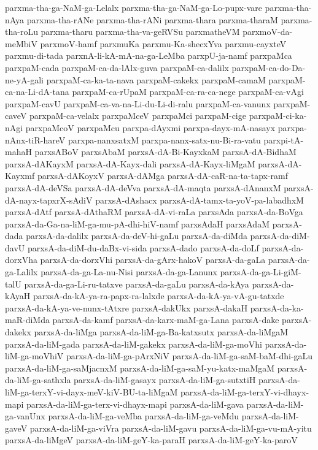 {parxma-tha-ga-NaM-ga-Lelalx
parxma-tha-ga-NaM-ga-Lo-pupx-vare
parxma-tha-nAya
parxma-tha-rANe
parxma-tha-rANi
parxma-thara
parxma-tharaM
parxma-tha-roLu
parxma-tharu
parxma-tha-va-geRVSu
parxmatheVM
parxmoV-da-meMbiV
parxmoV-hamf
parxmuKa
parxmu-Ka-shecxYva
parxmu-cayxteV
parxmu-di-tada
parxnA-li-kA-mA-na-ga-LeMba
parxpU-ja-namf
parxpaMca
parxpaM-cada
parxpaM-ca-da-lAlx-guva
parxpaM-ca-dalilx
parxpaM-ca-do-Da-ne-yA-gali
parxpaM-ca-ka-ta-nava
parxpaM-cakekx
parxpaM-camaM
parxpaM-ca-na-Li-dA-tana
parxpaM-ca-rUpaM
parxpaM-ca-ra-ca-nege
parxpaM-ca-vAgi
parxpaM-cavU
parxpaM-ca-va-na-Li-du-Li-di-ralu
parxpaM-ca-vanunx
parxpaM-caveV
parxpaM-ca-velalx
parxpaMceV
parxpaMci
parxpaM-cige
parxpaM-ci-ka-nAgi
parxpaMcoV
parxpaMcu
parxpa-dAyxmi
parxpa-dayx-mA-nasayx
parxpa-nAnx-tiR-hareV
parxpa-nanxsatxM
parxpa-nanx-satx-nu-Bi-ra-vatu
parxpi-tA-mahaH
parxsABoV
parxsAbaM
parxsA-dA-Bi-KayxkaM
parxsA-dA-BidhaM
parxsA-dAKayxM
parxsA-dA-Kayx-dali
parxsA-dA-Kayx-liMgaM
parxsA-dA-Kayxmf
parxsA-dAKoyxV
parxsA-dAMga
parxsA-dA-caR-na-ta-tapx-ramf
parxsA-dA-deVSa
parxsA-dA-deVva
parxsA-dA-maqta
parxsA-dAnanxM
parxsA-dA-nayx-tapxrX-sAdiV
parxsA-dAshacx
parxsA-dA-tamx-ta-yoV-pa-labadhxM
parxsA-dAtf
parxsA-dAthaRM
parxsA-dA-vi-raLa
parxsAda
parxsA-da-BoVga
parxsA-da-Ga-na-liM-ga-mu-pA-dhi-hiV-namf
parxsAdaH
parxsAdaM
parxsA-dada
parxsA-da-dalilx
parxsA-da-deV-hi-gaLu
parxsA-da-diMda
parxsA-da-diM-davU
parxsA-da-diM-du-daBx-vi-sida
parxsA-dado
parxsA-da-doLf
parxsA-da-dorxVha
parxsA-da-dorxVhi
parxsA-da-gArx-hakoV
parxsA-da-gaLa
parxsA-da-ga-Lalilx
parxsA-da-ga-La-nu-Nisi
parxsA-da-ga-Lanunx
parxsA-da-ga-Li-giM-talU
parxsA-da-ga-Li-ru-tatxve
parxsA-da-gaLu
parxsA-da-kAya
parxsA-da-kAyaH
parxsA-da-kA-ya-ra-papx-ra-lalxde
parxsA-da-kA-ya-vA-gu-tatxde
parxsA-da-kA-ya-ve-nunx-tAtxre
parxsA-dakUkx
parxsA-dakaH
parxsA-da-ka-maR-diMda
parxsA-da-kamf
parxsA-da-karx-maM-ga-Lana
parxsA-dake
parxsA-dakekx
parxsA-da-liMga
parxsA-da-liM-ga-Ba-katxsutx
parxsA-da-liMgaM
parxsA-da-liM-gada
parxsA-da-liM-gakekx
parxsA-da-liM-ga-moVhi
parxsA-da-liM-ga-moVhiV
parxsA-da-liM-ga-pArxNiV
parxsA-da-liM-ga-saM-baM-dhi-gaLu
parxsA-da-liM-ga-saMjacnxM
parxsA-da-liM-ga-saM-yu-katx-maMgaM
parxsA-da-liM-ga-sathxla
parxsA-da-liM-gasayx
parxsA-da-liM-ga-sutxtiH
parxsA-da-liM-ga-terxY-vi-dayx-meV-kiV-BU-ta-liMgaM
parxsA-da-liM-ga-terxY-vi-dhayx-mapi
parxsA-da-liM-ga-terx-vi-dhayx-mapi
parxsA-da-liM-gava
parxsA-da-liM-ga-vanUnx
parxsA-da-liM-ga-veMba
parxsA-da-liM-ga-veMdu
parxsA-da-liM-gaveV
parxsA-da-liM-ga-viVra
parxsA-da-liM-gavu
parxsA-da-liM-ga-vu-mA-yitu
parxsA-da-liMgeV
parxsA-da-liM-geY-ka-paraH
parxsA-da-liM-geY-ka-paroV
}
